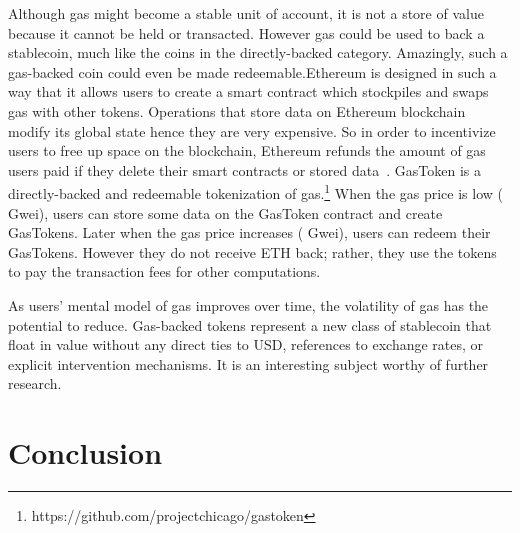 Although gas might become a stable unit of account, it is not a store of value because it cannot be held or transacted. However gas could be used to back a stablecoin, much like the coins in the directly-backed category. Amazingly, such a gas-backed coin could even be made redeemable.Ethereum is designed in such a way that it allows users to create a smart contract which stockpiles and swaps gas with other tokens. Operations that store data on Ethereum blockchain modify its global state hence they are very expensive. So in order to incentivize users to free up space on the blockchain, Ethereum refunds the amount of gas users paid if they delete their smart contracts or stored data~\cite{wood2014ethereum}. GasToken is a directly-backed and redeemable tokenization of gas.\footnote{https://github.com/projectchicago/gastoken} When the gas price is low ( Gwei), users can store some data on the GasToken contract and create GasTokens. Later when the gas price increases ( Gwei), users can redeem their GasTokens. However they do not receive ETH back; rather, they use the tokens to pay the transaction fees for other computations. 

As users' mental model of gas improves over time, the volatility of gas has the potential to reduce. Gas-backed tokens represent a new class of stablecoin that float in value without any direct ties to USD, references to exchange rates, or explicit intervention mechanisms. It is an interesting subject worthy of further research. 








\section{Conclusion}

